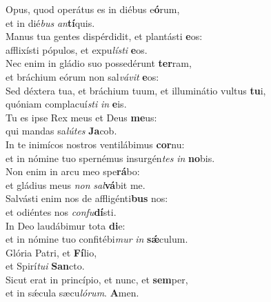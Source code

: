 \evenverse Opus, quod operátus es in diébus e\textbf{ó}rum,~\*\\
\evenverse et in dié\textit{bus} \textit{an}\textbf{tí}quis.\\
\oddverse Manus tua gentes dispérdidit, et plantásti \textbf{e}os:~\*\\
\oddverse afflixísti pópulos, et expu\textit{lí}\textit{sti} \textbf{e}os.\\
\evenverse Nec enim in gládio suo possedérunt \textbf{ter}ram,~\*\\
\evenverse et bráchium eórum non sal\textit{vá}\textit{vit} \textbf{e}os:\\
\oddverse Sed déxtera tua, et bráchium tuum, et illuminátio vultus \textbf{tu}i,~\*\\
\oddverse quóniam complacuí\textit{sti} \textit{in} \textbf{e}is.\\
\evenverse Tu es ipse Rex meus et Deus \textbf{me}us:~\*\\
\evenverse qui mandas sa\textit{lú}\textit{tes} \textbf{Ja}cob.\\
\oddverse In te inimícos nostros ventilábimus \textbf{cor}nu:~\*\\
\oddverse et in nómine tuo spernémus insurgén\textit{tes} \textit{in} \textbf{no}bis.\\
\evenverse Non enim in arcu meo spe\textbf{rá}bo:~\*\\
\evenverse et gládius meus \textit{non} \textit{sal}\textbf{vá}bit me.\\
\oddverse Salvásti enim nos de affligénti\textbf{bus} nos:~\*\\
\oddverse et odiéntes nos \textit{con}\textit{fu}\textbf{dí}sti.\\
\evenverse In Deo laudábimur tota \textbf{di}e:~\*\\
\evenverse et in nómine tuo confitébi\textit{mur} \textit{in} \textbf{sǽ}culum.\\
\oddverse Glória Patri, et \textbf{Fí}lio,~\*\\
\oddverse et Spirí\textit{tu}\textit{i} \textbf{San}cto.\\
\evenverse Sicut erat in princípio, et nunc, et \textbf{sem}per,~\*\\
\evenverse et in sǽcula sæcu\textit{ló}\textit{rum}. \textbf{A}men.\\
